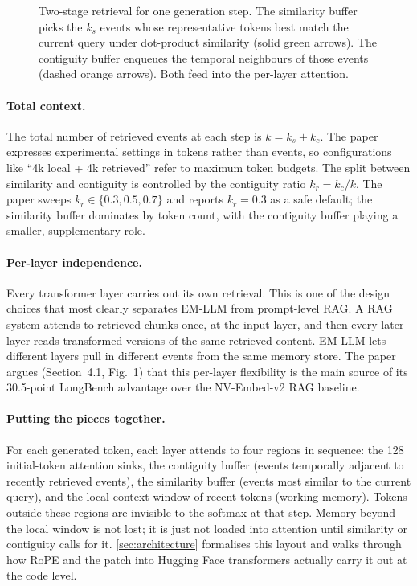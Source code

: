 \begin{figure}[h]
\centering

\caption{Two-stage retrieval for one generation step. The similarity buffer picks the $k_s$ events whose representative tokens best match the current query under dot-product similarity (solid green arrows). The contiguity buffer enqueues the temporal neighbours of those events (dashed orange arrows). Both feed into the per-layer attention.}
\label{fig:two-stage-retrieval}
\end{figure}

\paragraph{Total context.}
The total number of retrieved events at each step is $k = k_s + k_c$. The paper expresses experimental settings in tokens rather than events, so configurations like ``4k local + 4k retrieved'' refer to maximum token budgets. The split between similarity and contiguity is controlled by the contiguity ratio $k_r = k_c / k$. The paper sweeps $k_r \in \{0.3, 0.5, 0.7\}$ and reports $k_r = 0.3$ as a safe default; the similarity buffer dominates by token count, with the contiguity buffer playing a smaller, supplementary role.

\paragraph{Per-layer independence.}
Every transformer layer carries out its own retrieval. This is one of the design choices that most clearly separates EM-LLM from prompt-level RAG. A RAG system attends to retrieved chunks once, at the input layer, and then every later layer reads transformed versions of the same retrieved content. EM-LLM lets different layers pull in different events from the same memory store. The paper argues (Section~4.1, Fig.~1) that this per-layer flexibility is the main source of its 30.5-point LongBench advantage over the NV-Embed-v2 RAG baseline.

\paragraph{Putting the pieces together.}
For each generated token, each layer attends to four regions in sequence: the 128 initial-token attention sinks, the contiguity buffer (events temporally adjacent to recently retrieved events), the similarity buffer (events most similar to the current query), and the local context window of recent tokens (working memory). Tokens outside these regions are invisible to the softmax at that step. Memory beyond the local window is not lost; it is just not loaded into attention until similarity or contiguity calls for it. \cref{sec:architecture} formalises this layout and walks through how RoPE and the patch into Hugging Face transformers actually carry it out at the code level.
